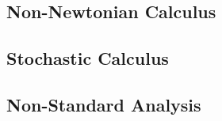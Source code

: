 \subsection{Non-Newtonian Calculus}


% 


\subsection{Stochastic Calculus}


\subsection{Non-Standard Analysis}






\begin{comment}

\end{comment}